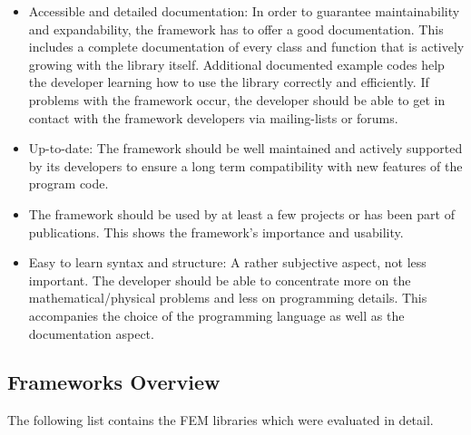 \begin{itemize}
  \item Accessible and detailed documentation: In order to guarantee maintainability and expandability, the framework has to offer a good documentation. This includes a complete documentation of every class and function that is actively growing with the library itself. Additional documented example codes help the developer learning how to use the library correctly and efficiently. If problems with the framework occur, the developer should be able to get in contact with the framework developers via mailing-lists or forums.
 
  \item Up-to-date: The framework should be well maintained and actively supported by its developers to ensure a long term compatibility with new features of the program code.
 
  \item The framework should be used by at least a few projects or has been part of publications. This shows the framework's importance and usability.
 
  \item Easy to learn syntax and structure: A rather subjective aspect, not less important. The developer should be able to concentrate more on the mathematical/physical problems and less on programming details. This accompanies the choice of the programming language as well as the documentation aspect.
 \end{itemize}
 
 
 
 \subsection{Frameworks Overview}
 The following list contains the FEM libraries which were evaluated in detail.
  
  
